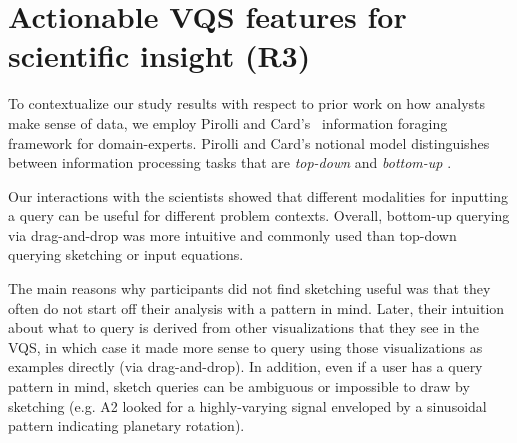 \section{Actionable VQS features for scientific insight (R3)} \label{VQS_features_discussion}
To contextualize our study results with respect to prior work on how analysts make sense of data, we employ Pirolli and Card's~\cite{Pirolli} information foraging framework for domain-experts. Pirolli and Card's notional model distinguishes between information processing tasks that are \textit{top-down}  and \textit{bottom-up} .  
\par Our interactions with the scientists showed that different modalities for inputting a query can be useful for different problem contexts.  Overall,  bottom-up querying via drag-and-drop was more intuitive and commonly used than top-down querying  sketching or input equations. 
\par The main reasons why participants did not find sketching useful was that they often do not start off their analysis with a pattern in mind. Later, their intuition about what to query is derived from other visualizations that they see in the VQS, in which case it made more sense to query using those visualizations as examples directly (via drag-and-drop). In addition, even if a user has a query pattern in mind, sketch queries can be ambiguous \cite{correll2016semantics} or impossible to draw by sketching (e.g. A2 looked for a highly-varying signal enveloped by a sinusoidal pattern indicating planetary rotation). 
